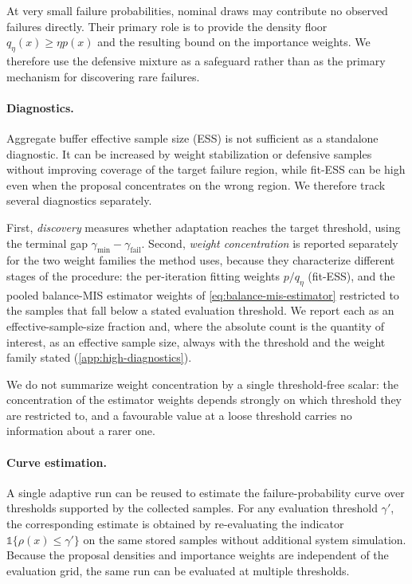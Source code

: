 \documentclass[twoside,11pt]{article}
\begin{document}
At very small failure probabilities, nominal draws may contribute no observed failures directly. Their primary role is to provide the density floor $q_\eta(x)\geq\eta p(x)$ and the resulting bound on the importance weights. We therefore use the defensive mixture as a safeguard rather than as the primary mechanism for discovering rare failures.

\paragraph{Diagnostics.}
Aggregate buffer effective sample size (ESS) is not sufficient as a standalone diagnostic. It can be increased by weight stabilization or defensive samples without improving coverage of the target failure region, while fit-ESS can be high even when the proposal concentrates on the wrong region. We therefore track several diagnostics separately. 

First, \emph{discovery} measures whether adaptation reaches the target threshold, using the terminal gap $\gamma_{\min}-\gamma_{\mathrm{fail}}.$ Second, \emph{weight concentration} is reported separately for the two weight families the method uses, because they characterize different stages of the procedure: the per-iteration fitting weights $p/q_\eta$ (fit-ESS), and the pooled balance-MIS estimator weights of \cref{eq:balance-mis-estimator} restricted to the samples that fall below a stated evaluation threshold. We report each as an effective-sample-size fraction and, where the absolute count is the quantity of interest, as an effective sample size, always with the threshold and the weight family stated (\cref{app:high-diagnostics}). 

We do not summarize weight concentration by a single threshold-free scalar: the concentration of the estimator weights depends strongly on which threshold they are restricted to, and a favourable value at a loose threshold carries no information about a rarer one.

\paragraph{Curve estimation.}
A single adaptive run can be reused to estimate the failure-probability curve over thresholds supported by the collected samples. For any evaluation threshold $\gamma'$, the corresponding estimate is obtained by re-evaluating the indicator $\mathds{1}\{\rho(x)\leq\gamma'\}$ on the same stored samples without additional system simulation. Because the proposal densities and importance weights are independent of the evaluation grid, the same run can be evaluated at multiple thresholds.
\end{document}
